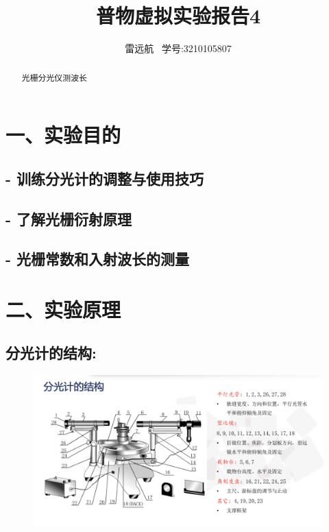 \documentclass{article}
\title{普物虚拟实验报告4}
\author{雷远航 \ 学号:3210105807}
\begin{document}
\maketitle

\begin{abstract}
    光栅分光仪测波长
\end{abstract}

\section*{一、实验目的}
\subsection*{- 训练分光计的调整与使用技巧}
\subsection*{- 了解光栅衍射原理}
\subsection*{- 光栅常数和入射波长的测量}


\section*{二、实验原理}
\subsection*{分光计的结构:}
\begin{figure}[H]
	\centering
	\includegraphics[width=1\textwidth]{1.png}
	\end{figure}
\end{document}
